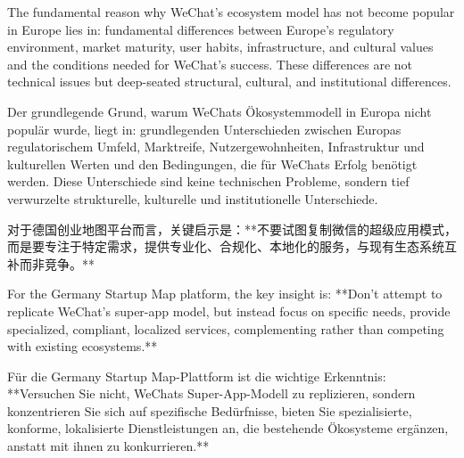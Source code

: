 \documentclass[11pt,a4paper]{article}
\begin{document}
The fundamental reason why WeChat's ecosystem model has not become popular in Europe lies in: fundamental differences between Europe's regulatory environment, market maturity, user habits, infrastructure, and cultural values and the conditions needed for WeChat's success. These differences are not technical issues but deep-seated structural, cultural, and institutional differences.

Der grundlegende Grund, warum WeChats Ökosystemmodell in Europa nicht populär wurde, liegt in: grundlegenden Unterschieden zwischen Europas regulatorischem Umfeld, Marktreife, Nutzergewohnheiten, Infrastruktur und kulturellen Werten und den Bedingungen, die für WeChats Erfolg benötigt werden. Diese Unterschiede sind keine technischen Probleme, sondern tief verwurzelte strukturelle, kulturelle und institutionelle Unterschiede.

对于德国创业地图平台而言，关键启示是：**不要试图复制微信的超级应用模式，而是要专注于特定需求，提供专业化、合规化、本地化的服务，与现有生态系统互补而非竞争。**

For the Germany Startup Map platform, the key insight is: **Don't attempt to replicate WeChat's super-app model, but instead focus on specific needs, provide specialized, compliant, localized services, complementing rather than competing with existing ecosystems.**

Für die Germany Startup Map-Plattform ist die wichtige Erkenntnis: **Versuchen Sie nicht, WeChats Super-App-Modell zu replizieren, sondern konzentrieren Sie sich auf spezifische Bedürfnisse, bieten Sie spezialisierte, konforme, lokalisierte Dienstleistungen an, die bestehende Ökosysteme ergänzen, anstatt mit ihnen zu konkurrieren.**
\end{document}
